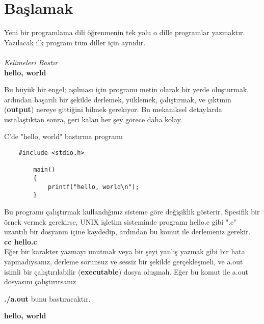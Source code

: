 \documentclass[a4paper,12pt,oneside]{book}
\begin{document}
\section{Başlamak}

Yeni bir programlama dili öğrenmenin tek yolu o dille programlar yazmaktır. Yazılacak ilk program tüm diller için aynıdır.
\\ \\ \hspace*{10mm} \textit{Kelimeleri Bastır}
\\ \hspace*{20mm} \textbf{hello, world} \\

\par Bu büyük bir engel; aşılması için programı metin olarak bir yerde oluşturmak, ardından başarılı bir şekilde derlemek, yüklemek, çalıştırmak, ve çıktının (\textbf{output}) nereye gittiğini bilmek gerekiyor. Bu mekaniksel detaylarda ustalaştıktan sonra, geri kalan her şey görece daha kolay.
    \par C'de "hello, world" bastırma programı
\begin{lstlisting}
    #include <stdio.h>

        main()
        {
            printf("hello, world\n");
        }
\end{lstlisting}

Bu programı çalıştırmak kullandığınız sisteme göre değişiklik gösterir. Spesifik bir örnek vermek gerekirse, UNIX işletim sisteminde programı hello.c gibi ".c" uzantılı bir dosyanın içine kaydedip, ardından bu komut ile derlemeniz gerekir. \\

\textbf{cc hello.c} \\

Eğer bir karakter yazmayı unutmak veya bir şeyi yanlış yazmak gibi bir hata yapmadıysanız, derleme sorunsuz ve sessiz bir şekilde gerçekleşmeli, ve a.out isimli bir çalıştırılabilir (\textbf{executable}) dosya oluşmalı. Eğer bu komut ile a.out dosyasını çalıştırırsanız \newline

\textbf{./a.out} \newline \newline
bunu bastıracaktır. \newline
\par \textbf{hello, world} \newline
\end{document}
